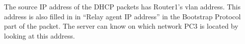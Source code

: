 The source IP address of the DHCP packets has Router1's vlan address. This address is also filled in in ``Relay agent IP address'' in the Bootstrap Protocol part of the packet. The server can know on which network PC3 is located by looking at this address.
